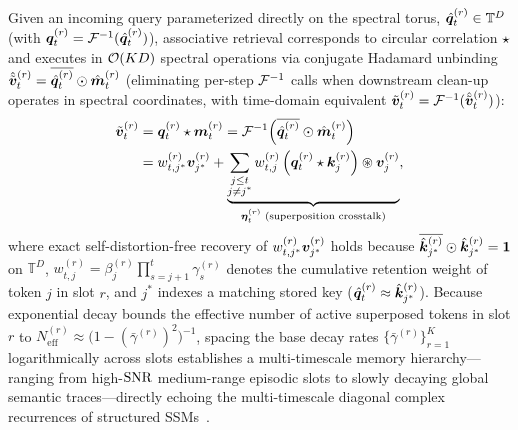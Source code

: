Given an incoming query parameterized directly on the spectral torus, $\hat{\boldsymbol{q}}_t^{(r)} \in \mathbb{T}^D$ (with $\boldsymbol{q}_t^{(r)} = \mathcal{F}^{-1}(\hat{\boldsymbol{q}}_t^{(r)})$), associative retrieval corresponds to circular correlation $\star$ and executes in $\mathcal{O}\!\left(K D\right)$ spectral operations via conjugate Hadamard unbinding $\hat{\tilde{\boldsymbol{v}}}_t^{(r)} = \overline{\hat{\boldsymbol{q}}_t^{(r)}} \odot \hat{\boldsymbol{m}}_t^{(r)}$ (eliminating per-step $\mathcal{F}^{-1}$ calls when downstream clean-up operates in spectral coordinates, with time-domain equivalent $\tilde{\boldsymbol{v}}_t^{(r)} = \mathcal{F}^{-1}(\hat{\tilde{\boldsymbol{v}}}_t^{(r)})$):
\begin{align}\label{eq:holo_kv_read}
    \tilde{\boldsymbol{v}}_t^{(r)}
    &= \boldsymbol{q}_t^{(r)} \star \boldsymbol{m}_t^{(r)}
     = \mathcal{F}^{-1}\!\left(\overline{\hat{\boldsymbol{q}}_t^{(r)}} \odot \hat{\boldsymbol{m}}_t^{(r)}\right) \nonumber\\
    &= w_{t,j^*}^{(r)} \boldsymbol{v}_{j^*}^{(r)}
       + \underbrace{\sum_{\substack{j \le t \\ j \neq j^*}} w_{t,j}^{(r)} \left(\boldsymbol{q}_t^{(r)} \star \boldsymbol{k}_j^{(r)}\right) \circledast \boldsymbol{v}_j^{(r)}}_{\boldsymbol{\eta}_t^{(r)} \text{ (superposition crosstalk)}},
\end{align}
where exact self-distortion-free recovery of $w_{t,j^*}^{(r)}\boldsymbol{v}_{j^*}^{(r)}$ holds because $\overline{\hat{\boldsymbol{k}}_{j^*}^{(r)}} \odot \hat{\boldsymbol{k}}_{j^*}^{(r)} = \boldsymbol{1}$ on $\mathbb{T}^D$, $w_{t,j}^{(r)} = \beta_j^{(r)} \prod_{s=j+1}^{t} \gamma_s^{(r)}$ denotes the cumulative retention weight of token $j$ in slot $r$, and $j^*$ indexes a matching stored key ($\hat{\boldsymbol{q}}_t^{(r)} \approx \hat{\boldsymbol{k}}_{j^*}^{(r)}$).
Because exponential decay bounds the effective number of active superposed tokens in slot $r$ to $N_{\mathrm{eff}}^{(r)} \approx \bigl(1 - (\bar{\gamma}^{(r)})^2\bigr)^{-1}$, spacing the base decay rates $\{\bar{\gamma}^{(r)}\}_{r=1}^{K}$ logarithmically across slots establishes a multi-timescale memory hierarchy---ranging from high-$\mathrm{SNR}$ medium-range episodic slots to slowly decaying global semantic traces---directly echoing the multi-timescale diagonal complex recurrences of structured SSMs~\cite{GU_SSM_S4_MAMBA}.

